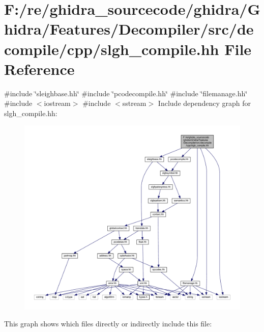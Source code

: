 \hypertarget{slgh__compile_8hh}{}\section{F\+:/re/ghidra\+\_\+sourcecode/ghidra/\+Ghidra/\+Features/\+Decompiler/src/decompile/cpp/slgh\+\_\+compile.hh File Reference}
\label{slgh__compile_8hh}
{\ttfamily \#include \char`\"{}sleighbase.\+hh\char`\"{}}\newline
{\ttfamily \#include \char`\"{}pcodecompile.\+hh\char`\"{}}\newline
{\ttfamily \#include \char`\"{}filemanage.\+hh\char`\"{}}\newline
{\ttfamily \#include $<$iostream$>$}\newline
{\ttfamily \#include $<$sstream$>$}\newline
Include dependency graph for slgh\+\_\+compile.\+hh\+:
\nopagebreak
\begin{figure}[H]
\begin{center}
\leavevmode
\includegraphics[width=350pt]{slgh__compile_8hh__incl}
\end{center}
\end{figure}
This graph shows which files directly or indirectly include this file\+:
\nopagebreak
